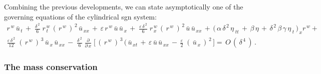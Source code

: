 \documentclass[alpha-refs, 12pt]{wiley-article}
\newcommand{\eps}{\varepsilon}
\begin{document}
Combining the previous developments, we can state asymptotically one of the governing equations of the cylindrical \acrfull{sgn} system:
\begin{multline*}
  r^{\,w}\,\bar{u}_{\,t}\,+\;\frac{\delta^{\,2}}{6}\;r^{\,w}_{\,t}\,(\,r^{\,w}\,)^{\,2}\,\bar{u}_{\,xx}\,+\,\eps\, r^{\,w}\,\bar{u}\,\bar{u}_{\,x}\,+\;\frac{\eps\,\delta^{\,2}}{6}\;r^{\,w}_{\,x}\,(\,r^{\,w}\,)^{\,2}\,\bar{u}\,\bar{u}_{\,xx}\,+\,\bigl(\,\alpha\,\delta^{\,2}\,\eta_{\;tt}\,+\,\beta\,\eta\, +\,\delta^{\,2}\,\beta\,\gamma\,\eta_{\;t}\,\bigr)_{\,x}r^{\,w}
   + \\
   \frac{\eps\,\delta^{\,2}}{12}\;(\,r^{\,w}\,)^{\,3}\,\bar{u}_{\,x}\,\bar{u}_{\,xx}\,-\;\frac{\delta^{\,2}}{6}\;\frac{\partial}{\partial\,x}\;\bigl[\,(\,r^{\,w}\,)^{\,3}\,(\,\bar{u}_{\,xt}\,+\,\eps\,\bar{u}\, \bar{u}_{\,xx}\, - \,\frac{\eps}{2}\;(\,\bar{u}_{\,x}\,)^{\,2}\,\bigr]
   =\,O\,(\,\delta^{\,4}\,)\,.
\end{multline*}

\subsubsection{The mass conservation}
\end{document}
